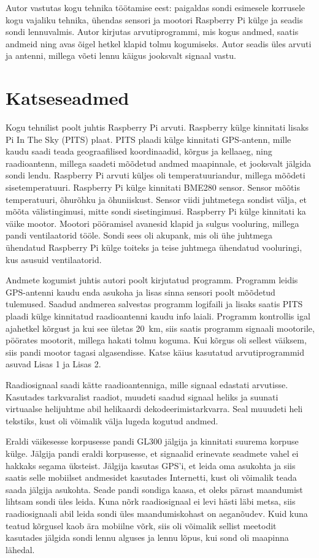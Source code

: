 \documentclass{trkut}%
\begin{document}
Autor vastutas kogu tehnika töötamise eest: paigaldas sondi esimesele korrusele kogu vajaliku tehnika, ühendas sensori ja mootori Raspberry Pi külge ja seadis sondi lennuvalmis. Autor kirjutas arvutiprogrammi, mis kogus andmed, saatis andmeid ning avas õigel hetkel klapid tolmu kogumiseks. Autor seadis üles arvuti ja antenni, millega võeti lennu käigus jooksvalt signaal vastu.

\section{Katseseadmed}
Kogu tehnilist poolt juhtis Raspberry Pi arvuti. Raspberry külge kinnitati lisaks Pi In The Sky (PITS) plaat. PITS plaadi külge kinnitati GPS-antenn, mille kaudu saadi teada geograafilised koordinaadid, kõrgus ja kellaaeg, ning raadioantenn, millega saadeti mõõdetud andmed maapinnale, et jooksvalt jälgida sondi lendu. Raspberry Pi arvuti küljes oli temperatuuriandur, millega mõõdeti sisetemperatuuri. Raspberry Pi külge kinnitati BME280 sensor. Sensor mõõtis temperatuuri, õhurõhku ja õhuniiskust. Sensor viidi juhtmetega sondist välja, et mõõta välistingimusi, mitte sondi sisetingimusi. Raspberry Pi külge kinnitati ka väike mootor. Mootori pööramisel avanesid klapid ja sulgus vooluring, millega pandi ventilaatorid tööle. Sondi sees oli akupank, mis oli ühe juhtmega ühendatud Raspberry Pi külge toiteks ja teise juhtmega ühendatud vooluringi, kus asusuid ventilaatorid.

Andmete kogumist juhtis autori poolt kirjutatud programm. Programm leidis GPS-antenni kaudu enda asukoha ja lisas sinna sensori poolt mõõdetud tulemused. Saadud andmerea salvestas programm logifaili ja lisaks saatis PITS plaadi külge kinnitatud raadioantenni kaudu info laiali. Programm kontrollis igal ajahetkel kõrgust ja kui see ületas \SI{20}{km}, siis saatis programm signaali mootorile, pöörates mootorit, millega hakati tolmu koguma. Kui kõrgus oli sellest väiksem, siis pandi mootor tagasi algasendisse. Katse käius kasutatud arvutiprogrammid asuvad Lisas 1 ja Lisas 2.

Raadiosignaal saadi kätte raadioantenniga, mille signaal edastati arvutisse. Kasutades tarkvaralist raadiot, muudeti saadud signaal heliks ja suunati virtuaalse helijuhtme abil helikaardi dekodeerimistarkvarra. Seal muuudeti heli tekstiks, kust oli võimalik välja lugeda kogutud andmed.

Eraldi väikesesse korpusesse pandi GL300 jälgija ja kinnitati suurema korpuse külge. Jälgija pandi eraldi korpusesse, et signaalid erinevate seadmete vahel ei hakkaks segama üksteist. Jälgija kasutas GPS'i, et leida oma asukohta ja siis saatis selle mobiilset andmesidet kasutades Internetti, kust oli võimalik teada saada jälgija asukohta. Seade pandi sondiga kaasa, et oleks pärast maandumist lihtsam sondi üles leida. Kuna nõrk raadiosignaal ei levi hästi läbi metsa, siis raadiosignaali abil leida sondi üles maandumiskohast on aeganõudev. Kuid kuna teatud kõrgusel kaob ära mobiilne võrk, siis oli võimalik sellist meetodit kasutades jälgida sondi lennu alguses ja lennu lõpus, kui sond oli maapinna lähedal.
\end{document}
